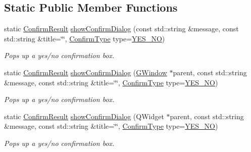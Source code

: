 \subsection*{Static Public Member Functions}
\begin{DoxyCompactItemize}
\item 
static \mbox{\hyperlink{classGOptionPane_a1cc9e8685029e39646671ed71f32d47d}{Confirm\+Result}} \mbox{\hyperlink{classGOptionPane_a5aa43cc516e91b8befcd129ac11ebc96}{show\+Confirm\+Dialog}} (const std\+::string \&message, const std\+::string \&title=\char`\"{}\char`\"{}, \mbox{\hyperlink{classGOptionPane_a6a1aaf19c06f5a6bef89ea6415547049}{Confirm\+Type}} type=\mbox{\hyperlink{classGOptionPane_a6a1aaf19c06f5a6bef89ea6415547049a23d16d66a433471aa62deadacecfc08d}{Y\+E\+S\+\_\+\+NO}})
\begin{DoxyCompactList}\small\item\em Pops up a yes/no confirmation box. \end{DoxyCompactList}\item 
static \mbox{\hyperlink{classGOptionPane_a1cc9e8685029e39646671ed71f32d47d}{Confirm\+Result}} \mbox{\hyperlink{classGOptionPane_a67b4bfe05d029f3575a4b9e341e786ec}{show\+Confirm\+Dialog}} (\mbox{\hyperlink{classGWindow}{G\+Window}} $\ast$parent, const std\+::string \&message, const std\+::string \&title=\char`\"{}\char`\"{}, \mbox{\hyperlink{classGOptionPane_a6a1aaf19c06f5a6bef89ea6415547049}{Confirm\+Type}} type=\mbox{\hyperlink{classGOptionPane_a6a1aaf19c06f5a6bef89ea6415547049a23d16d66a433471aa62deadacecfc08d}{Y\+E\+S\+\_\+\+NO}})
\begin{DoxyCompactList}\small\item\em Pops up a yes/no confirmation box. \end{DoxyCompactList}\item 
static \mbox{\hyperlink{classGOptionPane_a1cc9e8685029e39646671ed71f32d47d}{Confirm\+Result}} \mbox{\hyperlink{classGOptionPane_a19401c5fe238589904bc44319cc80b41}{show\+Confirm\+Dialog}} (Q\+Widget $\ast$parent, const std\+::string \&message, const std\+::string \&title=\char`\"{}\char`\"{}, \mbox{\hyperlink{classGOptionPane_a6a1aaf19c06f5a6bef89ea6415547049}{Confirm\+Type}} type=\mbox{\hyperlink{classGOptionPane_a6a1aaf19c06f5a6bef89ea6415547049a23d16d66a433471aa62deadacecfc08d}{Y\+E\+S\+\_\+\+NO}})
\begin{DoxyCompactList}\small\item\em Pops up a yes/no confirmation box. \end{DoxyCompactList}\item 

\end{DoxyCompactItemize}
